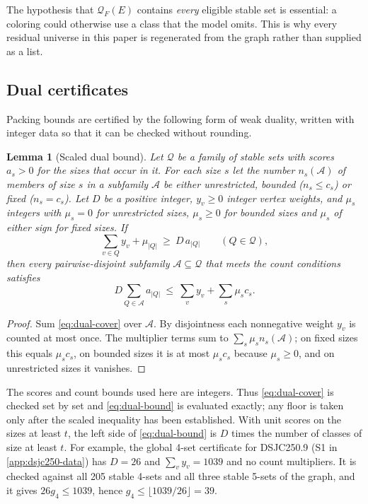 \documentclass[11pt]{article}
\newtheorem{lemma}[theorem]{Lemma}
\theoremstyle{definition}
\newcommand{\DSJCTwoFifty}{\textnormal{\textsc{DSJC250.9}}}
\newcommand{\Res}{\mathcal{Q}}
\begin{document}
The hypothesis that $\Res_F(E)$ contains \emph{every} eligible stable set is
essential: a coloring could otherwise use a class that the model omits. This
is why every residual universe in this paper is regenerated from the graph
rather than supplied as a list.

\subsection{Dual certificates}
\label{sec:dual-certificates}

Packing bounds are certified by the following form of weak duality, written
with integer data so that it can be checked without rounding.

\begin{lemma}[Scaled dual bound]
\label{lem:scaled-dual}
Let $\mathcal Q$ be a family of stable sets with scores $a_s>0$ for the sizes
that occur in it. For each size $s$ let the number $n_s(\mathcal A)$ of
members of size $s$ in a subfamily $\mathcal A$ be either unrestricted,
bounded ($n_s\le c_s$) or fixed ($n_s=c_s$). Let $D$ be a positive integer,
$y_v\ge0$ integer vertex weights, and $\mu_s$ integers with $\mu_s=0$ for
unrestricted sizes, $\mu_s\ge0$ for bounded sizes and $\mu_s$ of either sign
for fixed sizes. If
\begin{equation}
\label{eq:dual-cover}
  \sum_{v\in Q}y_v+\mu_{|Q|}\ \ge\ D\,a_{|Q|}\qquad(Q\in\mathcal Q),
\end{equation}
then every pairwise-disjoint subfamily $\mathcal A\subseteq\mathcal Q$ that
meets the count conditions satisfies
\begin{equation}
\label{eq:dual-bound}
  D\sum_{Q\in\mathcal A}a_{|Q|}\ \le\ \sum_{v}y_v+\sum_s\mu_sc_s.
\end{equation}
\end{lemma}

\begin{proof}
Sum \eqref{eq:dual-cover} over $\mathcal A$. By disjointness each
nonnegative weight $y_v$ is counted at most once. The multiplier terms sum to
$\sum_s\mu_sn_s(\mathcal A)$; on fixed sizes this equals $\mu_sc_s$, on
bounded sizes it is at most $\mu_sc_s$ because $\mu_s\ge0$, and on
unrestricted sizes it vanishes.
\end{proof}

The scores and count bounds used here are integers. Thus
\eqref{eq:dual-cover} is checked set by set and \eqref{eq:dual-bound} is
evaluated exactly; any floor is taken only after
the scaled inequality has been established. With unit scores on the sizes at
least $t$, the left side of \eqref{eq:dual-bound} is $D$ times the number of
classes of size at least $t$. For example, the global 4-set certificate for
\DSJCTwoFifty{} (S1 in \cref{app:dsjc250-data}) has $D=26$ and
$\sum_vy_v=1039$ and no count multipliers. It is checked against all 205
stable 4-sets and all three stable 5-sets of the graph, and it gives
$26g_4\le1039$, hence $g_4\le\lfloor1039/26\rfloor=39$.
\end{document}
